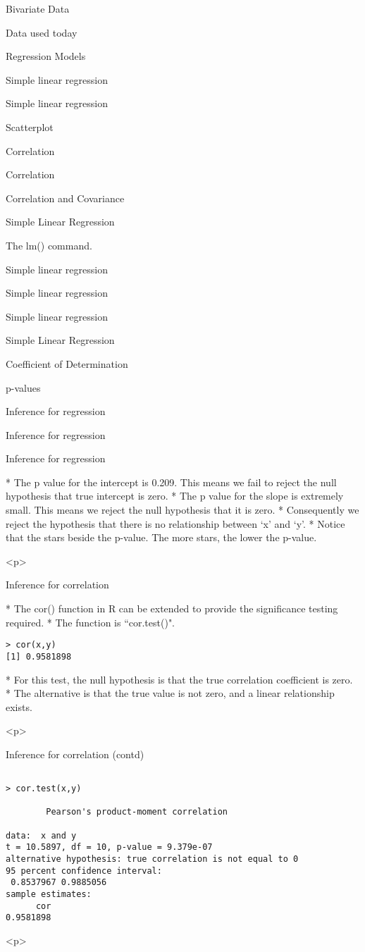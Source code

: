 \begin{slide}{Bivariate Data}
\begin{slide}{Data used today}
\begin{slide}{Regression Models}
\begin{slide}{Simple linear regression}
\begin{slide}{Simple linear regression}
\begin{slide}{Scatterplot}
\begin{slide}{Correlation}
\begin{slide}{Correlation}
\begin{slide}{Correlation and Covariance}
\begin{slide}{Simple Linear Regression}
\begin{slide}{The lm() command.}
\begin{slide}{Simple linear regression}
\begin{slide}{Simple linear regression}
\begin{slide}{Simple linear regression}
\begin{slide}{Simple Linear Regression}
\begin{slide}{Coefficient of Determination}
\begin{slide}{p-values}
\begin{slide}{Inference for regression}
\begin{slide}{Inference for regression}
\begin{slide}{Inference for regression}
\begin{itemize}
* The p value for the intercept is 0.209. This means we fail to reject the null hypothesis that true intercept is zero.
* The p value for the slope is extremely small. This means we reject the null hypothesis that it is zero.
* Consequently we reject the hypothesis that there is no relationship between `x' and `y'.
* Notice that the stars beside the p-value. The more stars, the lower the p-value.
\end{itemize}
<p>


\begin{slide}{Inference for correlation}
\begin{itemize}

* The cor() function in R can be extended to provide the significance testing required. 
* The function is ``cor.test()".
\begin{verbatim}
> cor(x,y)
[1] 0.9581898

\end{verbatim}
* For this test, the null hypothesis is that the true correlation coefficient is zero.
* The alternative is that the true value is not zero, and a linear relationship exists.
\end{itemize}
<p>


\begin{slide}{Inference for correlation (contd)}
\begin{verbatim}

> cor.test(x,y)

        Pearson's product-moment correlation

data:  x and y
t = 10.5897, df = 10, p-value = 9.379e-07
alternative hypothesis: true correlation is not equal to 0
95 percent confidence interval:
 0.8537967 0.9885056
sample estimates:
      cor
0.9581898 

\end{verbatim}
<p>


\end{slide}
\end{slide}
\end{slide}
\end{slide}
\end{slide}
\end{slide}
\end{slide}
\end{slide}
\end{slide}
\end{slide}
\end{slide}
\end{slide}
\end{slide}
\end{slide}
\end{slide}
\end{slide}
\end{slide}
\end{slide}
\end{slide}
\end{slide}
\end{slide}
\end{slide}
